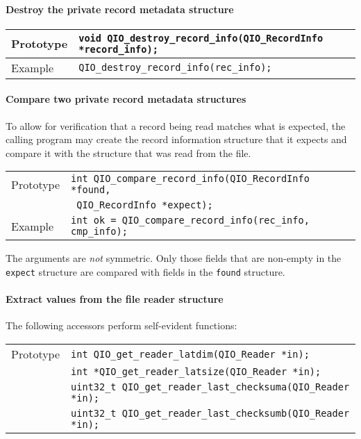 \documentclass{article}
\begin{document}
\paragraph{Destroy the private record metadata structure}
%
\begin{flushleft}
  \begin{tabular}{|l|l|}
  \hline
  Prototype      & \verb|void QIO_destroy_record_info(QIO_RecordInfo *record_info);| \\
\hline
  Example  & \verb|QIO_destroy_record_info(rec_info);|\\
   \hline
 \end{tabular}
\end{flushleft}
%

\paragraph{Compare two private record metadata structures}
To allow for verification that a record being read matches what is
expected, the calling program may create the record information
structure that it expects and compare it with the structure that
was read from the file.

%
\begin{flushleft}
  \begin{tabular}{|l|l|}
  \hline
  Prototype      & \verb|int QIO_compare_record_info(QIO_RecordInfo *found,|\\
                 & \verb| QIO_RecordInfo *expect);| \\
\hline
  Example  & \verb|int ok = QIO_compare_record_info(rec_info, cmp_info);|\\
   \hline
 \end{tabular}
\end{flushleft}
%
The arguments are {\it not} symmetric.  Only those fields that are
non-empty in the \verb|expect| structure are compared with fields in
the \verb|found| structure.

\paragraph{Extract values from the file reader structure}
The following accessors perform self-evident functions:
%
%
\begin{flushleft}
  \begin{tabular}{|l|l|}
  \hline
  Prototype      & \verb|int QIO_get_reader_latdim(QIO_Reader *in);| \\
                 & \verb|int *QIO_get_reader_latsize(QIO_Reader *in);| \\
                 & \verb|uint32_t QIO_get_reader_last_checksuma(QIO_Reader *in);| \\
                 & \verb|uint32_t QIO_get_reader_last_checksumb(QIO_Reader *in);| \\
\hline
 \end{tabular}
\end{flushleft}
\end{document}
